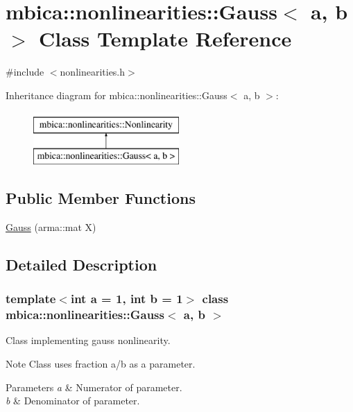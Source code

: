 \hypertarget{classmbica_1_1nonlinearities_1_1_gauss}{
\section{mbica::nonlinearities::Gauss$<$ a, b $>$ Class Template Reference}
\label{classmbica_1_1nonlinearities_1_1_gauss}
}


{\ttfamily \#include $<$nonlinearities.h$>$}

Inheritance diagram for mbica::nonlinearities::Gauss$<$ a, b $>$:\begin{figure}[H]
\begin{center}
\leavevmode
\includegraphics[height=2.000000cm]{classmbica_1_1nonlinearities_1_1_gauss}
\end{center}
\end{figure}
\subsection*{Public Member Functions}
\begin{DoxyCompactItemize}
\item 
\hyperlink{classmbica_1_1nonlinearities_1_1_gauss_a14780d268824e70e1b33988120092b81}{Gauss} (arma::mat X)
\end{DoxyCompactItemize}


\subsection{Detailed Description}
\subsubsection*{template$<$int a = 1, int b = 1$>$ class mbica::nonlinearities::Gauss$<$ a, b $>$}

Class implementing gauss nonlinearity.

\begin{DoxyNote}{Note}
Class uses fraction a/b as a parameter.
\end{DoxyNote}

\begin{DoxyParams}{Parameters}
{\em a} & Numerator of parameter. \\
\hline
{\em b} & Denominator of parameter. \\
\hline
\end{DoxyParams}


